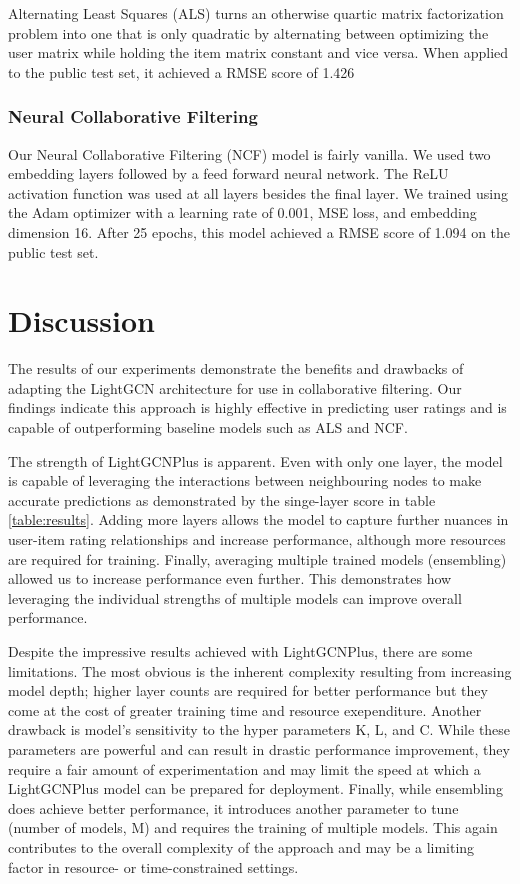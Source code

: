 \documentclass[10pt,conference,compsocconf]{IEEEtran}
\begin{document}
Alternating Least Squares (ALS) turns an otherwise quartic matrix factorization problem into one that is only quadratic by alternating between optimizing the user matrix while holding the item matrix constant and vice versa. When applied to the public test set, it achieved a RMSE score of 1.426

\subsubsection{Neural Collaborative Filtering}

Our Neural Collaborative Filtering (NCF) model is fairly vanilla. We used two embedding layers followed by a feed forward neural network. The ReLU activation function was used at all layers besides the final layer. We trained using the Adam optimizer with a learning rate of 0.001, MSE loss, and embedding dimension 16. After 25 epochs, this model achieved a RMSE score of 1.094 on the public test set.


\section{Discussion}
\label{sec:discussion}
\label{sec:tips-software}

The results of our experiments demonstrate the benefits and drawbacks of adapting the LightGCN architecture for use in collaborative filtering. Our findings indicate this approach is highly effective in predicting user ratings and is capable of outperforming baseline models such as ALS and NCF. 

The strength of LightGCNPlus is apparent. Even with only one layer, the model is capable of leveraging the interactions between neighbouring nodes to make accurate predictions as demonstrated by the singe-layer score in table \ref{table:results}. Adding more layers allows the model to capture further nuances in user-item rating relationships and increase performance, although more resources are required for training. Finally, averaging multiple trained models (ensembling) allowed us to increase performance even further. This demonstrates how leveraging the individual strengths of multiple models can improve overall performance.

Despite the impressive results achieved with LightGCNPlus, there are some limitations. The most obvious is the inherent complexity resulting from increasing model depth; higher layer counts are required for better performance but they come at the cost of greater training time and resource exependiture. Another drawback is model's sensitivity to the hyper parameters K, L, and C. While these parameters are powerful and can result in drastic performance improvement, they require a fair amount of experimentation and may limit the speed at which a LightGCNPlus model can be prepared for deployment. Finally, while ensembling does achieve better performance, it introduces another parameter to tune (number of models, M) and requires the training of multiple models. This again contributes to the overall complexity of the approach and may be a limiting factor in resource- or time-constrained settings.





\end{document}

